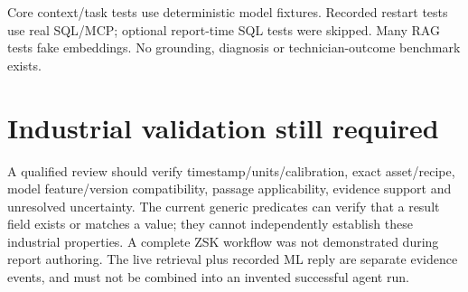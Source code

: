 Core context/task tests use deterministic model fixtures. Recorded restart tests use real SQL/MCP; optional report-time SQL tests were skipped. Many RAG tests fake embeddings. No grounding, diagnosis or technician-outcome benchmark exists.
\section{Industrial validation still required}
A qualified review should verify timestamp/units/calibration, exact asset/recipe, model feature/version compatibility, passage applicability, evidence support and unresolved uncertainty. The current generic predicates can verify that a result field exists or matches a value; they cannot independently establish these industrial properties. A complete ZSK workflow was not demonstrated during report authoring. The live retrieval plus recorded ML reply are separate evidence events, and must not be combined into an invented successful agent run.
